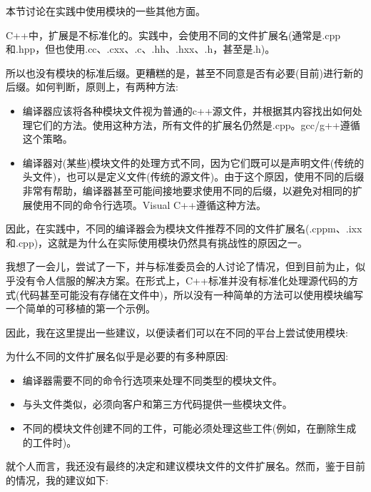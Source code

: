 

本节讨论在实践中使用模块的一些其他方面。



C++中，扩展是不标准化的。实践中，会使用不同的文件扩展名(通常是.cpp和.hpp，但也使用.cc、.cxx、.c、.hh、.hxx、.h，甚至是.h)。

所以也没有模块的标准后缀。更糟糕的是，甚至不同意是否有必要(目前)进行新的后缀。如何判断，原则上，有两种方法:

\begin{itemize}
\item 
编译器应该将各种模块文件视为普通的c++源文件，并根据其内容找出如何处理它们的方法。使用这种方法，所有文件的扩展名仍然是.cpp。gcc/g++遵循这个策略。
 
\item 
编译器对(某些)模块文件的处理方式不同，因为它们既可以是声明文件(传统的头文件)，也可以是定义文件(传统的源文件)。由于这个原因，使用不同的后缀非常有帮助，编译器甚至可能间接地要求使用不同的后缀，以避免对相同的扩展使用不同的命令行选项。Visual C++遵循这种方法。
\end{itemize}

因此，在实践中，不同的编译器会为模块文件推荐不同的文件扩展名(.cppm、.ixx和.cpp)，这就是为什么在实际使用模块仍然具有挑战性的原因之一。

我想了一会儿，尝试了一下，并与标准委员会的人讨论了情况，但到目前为止，似乎没有令人信服的解决方案。在形式上，C++标准并没有标准化处理源代码的方式(代码甚至可能没有存储在文件中)，所以没有一种简单的方法可以使用模块编写一个简单的可移植的第一个示例。

因此，我在这里提出一些建议，以便读者们可以在不同的平台上尝试使用模块:

为什么不同的文件扩展名似乎是必要的有多种原因:

\begin{itemize}
\item 
编译器需要不同的命令行选项来处理不同类型的模块文件。

\item 
与头文件类似，必须向客户和第三方代码提供一些模块文件。

\item 
不同的模块文件创建不同的工件，可能必须处理这些工件(例如，在删除生成的工件时)。
\end{itemize}

就个人而言，我还没有最终的决定和建议模块文件的文件扩展名。然而，鉴于目前的情况，我的建议如下:

